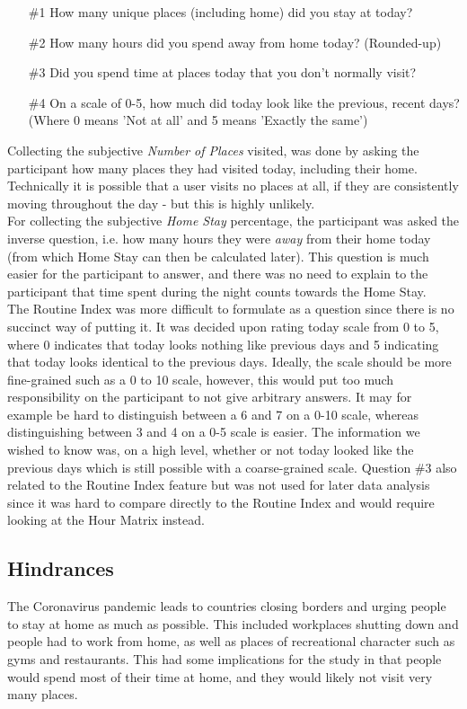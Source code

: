 \begin{itemize}
    \item[\#1] How many unique places (including home) did you stay at today?
    \item[\#2] How many hours did you spend away from home today? (Rounded-up)
    \item[\#3] Did you spend time at places today that you don't normally visit?
    \item[\#4] On a scale of 0-5, how much did today look like the previous, recent days? (Where 0 means 'Not at all' and 5 means 'Exactly the same')
\end{itemize}

Collecting the subjective \textit{Number of Places} visited, was done by asking the participant how many places they had visited today, including their home. Technically it is possible that a user visits no places at all, if they are consistently moving throughout the day - but this is highly unlikely.\\

For collecting the subjective \textit{Home Stay} percentage, the participant was asked the inverse question, i.e. how many hours they were \textit{away} from their home today (from which Home Stay can then be calculated later). This question is much easier for the participant to answer, and there was no need to explain to the participant that time spent during the night counts towards the Home Stay. \\

The Routine Index was more difficult to formulate as a question since there is no succinct way of putting it. It was decided upon rating today scale from 0 to 5, where 0 indicates that today looks nothing like previous days and 5 indicating that today looks identical to the previous days. Ideally, the scale should be more fine-grained such as a 0 to 10 scale, however, this would put too much responsibility on the participant to not give arbitrary answers. It may for example be hard to distinguish between a 6 and 7 on a 0-10 scale, whereas distinguishing between 3 and 4 on a 0-5 scale is easier. The information we wished to know was, on a high level, whether or not today looked like the previous days which is still possible with a coarse-grained scale. Question \#3 also related to the Routine Index feature but was not used for later data analysis since it was hard to compare directly to the Routine Index and would require looking at the Hour Matrix instead.

\subsection{Hindrances}
The Coronavirus pandemic leads to countries closing borders and urging people to stay at home as much as possible. This included workplaces shutting down and people had to work from home, as well as places of recreational character such as gyms and restaurants. This had some implications for the study in that people would spend most of their time at home, and they would likely not visit very many places.\\

